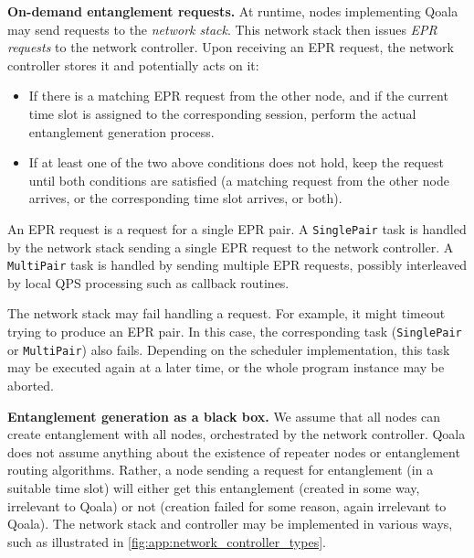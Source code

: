 \textbf{On-demand entanglement requests.} At runtime, nodes implementing Qoala may send requests to the \textit{network stack}.
This network stack then issues \textit{EPR requests} to the network controller.
Upon receiving an EPR request, the network controller stores it and potentially acts on it:
\begin{itemize}
    \item If there is a matching EPR request from the other node, and if the current time slot is assigned to the corresponding session, perform the actual entanglement generation process.
    \item If at least one of the two above conditions does not hold, keep the request until both conditions are satisfied (a matching request from the other node arrives, or the corresponding time slot arrives, or both).
\end{itemize}

An EPR request is a request for a single EPR pair. A \texttt{SinglePair} task is handled by the network stack sending a single EPR request to the network controller.
A \texttt{MultiPair} task is handled by sending multiple EPR requests, possibly interleaved by local QPS processing such as callback routines.

The network stack may fail handling a request. For example, it might timeout trying to produce an EPR pair. In this case, the corresponding task (\texttt{SinglePair} or \texttt{MultiPair}) also fails.
Depending on the scheduler implementation, this task may be executed again at a later time, or the whole program instance may be aborted.


\textbf{Entanglement generation as a black box.} We assume that all nodes can create entanglement with all nodes, orchestrated by the network controller.
Qoala does not assume anything about the existence of repeater nodes or entanglement routing algorithms.
Rather, a node sending a request for entanglement (in a suitable time slot) will either get this entanglement (created in some way, irrelevant to Qoala) or not (creation failed for some reason, again irrelevant to Qoala).
The network stack and controller may be implemented in various ways, such as illustrated in \cref{fig:app:network_controller_types}.
